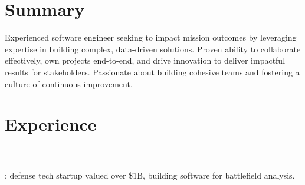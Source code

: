 %
%
\sectionsep
\section{Summary}

\raggedright

Experienced software engineer seeking to impact mission outcomes by leveraging expertise in building complex, data-driven solutions. Proven ability to collaborate effectively, own projects end-to-end, and drive innovation to deliver impactful results for stakeholders. Passionate about building cohesive teams and fostering a culture of continuous improvement.

\sectionsep

\section{Experience}
\\
\\
; defense tech startup valued over \$1B, building software for battlefield analysis.

